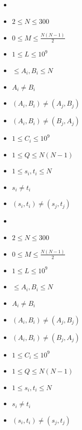 \documentclass{whiteboard}
\begin{document}
\begin{frame}[plain,t]
\vspace*{\fill}

 \vspace{0.1in}

 \begin{footnotesize}
 \begin{itemize}
 \item {}
 \item $2\leq N\leq 300$
 \item $0\leq M \leq \frac{N(N - 1)}{2}$
 \item $1\leq L\leq 10^9$
 \item $\leq A_i, B_i\leq N$
 \item $A_i\neq B_i$
 \item $(A_i, B_i)\neq (A_j, B_j)$ 
 \item $(A_i, B_i)\neq (B_j, A_j)$ 
 \item $1\leq C_i\leq 10^9$
 \item $1\leq Q\leq N(N - 1)$
 \item $1\leq s_i, t_i\leq N$
 \item $s_i\neq t_i$
 \item $(s_i, t_i)\neq (s_j, t_j)$ 
 \end{itemize}
 \end{footnotesize}
\vspace*{\fill}
\end{frame}

\begin{frame}[plain,t]
\vspace*{\fill}

 \vspace{0.1in}

 \begin{footnotesize}
 \begin{itemize}
 \item {}
 \item $2\leq N\leq 300$
 \item $0\leq M \leq \frac{N(N - 1)}{2}$
 \item $1\leq L\leq 10^9$
 \item $\leq A_i, B_i\leq N$
 \item $A_i\neq B_i$
 \item $(A_i, B_i)\neq (A_j, B_j)$ 
 \item $(A_i, B_i)\neq (B_j, A_j)$ 
 \item $1\leq C_i\leq 10^9$
 \item $1\leq Q\leq N(N - 1)$
 \item $1\leq s_i, t_i\leq N$
 \item $s_i\neq t_i$
 \item $(s_i, t_i)\neq (s_j, t_j)$ 
 \end{itemize}
 \end{footnotesize}
\vspace*{\fill}
\end{frame}
\end{document}
